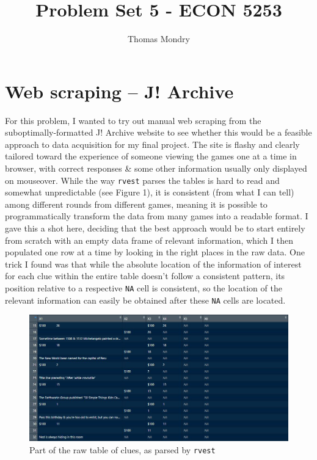 \documentclass{article}
\title{Problem Set 5 - ECON 5253}
\author{Thomas Mondry}
\begin{document}
\maketitle

\section{Web scraping -- J! Archive}

For this problem, I wanted to try out manual web scraping from the suboptimally-formatted J! Archive website to see whether this would be a feasible approach to data acquisition for my final project. The site is flashy and clearly tailored toward the experience of someone viewing the games one at a time in browser, with correct responses \& some other information usually only displayed on mouseover. While the way \texttt{rvest} parses the tables is hard to read and somewhat unpredictable (see Figure 1), it is consistent (from what I can tell) among different rounds from different games, meaning it is possible to programmatically transform the data from many games into a readable format. I gave this a shot here, deciding that the best approach would be to start entirely from scratch with an empty data frame of relevant information, which I then populated one row at a time by looking in the right places in the raw data. One trick I found was that while the absolute location of the information of interest for each clue within the entire table doesn't follow a consistent pattern, its position relative to a respective \texttt{NA} cell is consistent, so the location of the relevant information can easily be obtained after these \texttt{NA} cells are located.

\begin{figure}[h]
	\centering
	\includegraphics[width=\textwidth]{screenshot_raw.jpg}
	\caption{Part of the raw table of clues, as parsed by \texttt{rvest}}
\end{figure}
\end{document}
